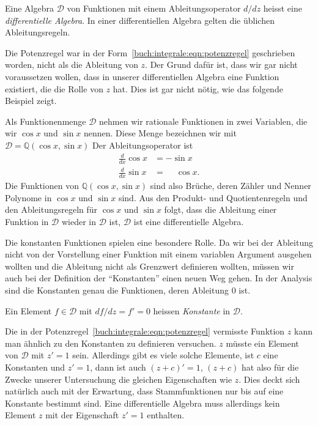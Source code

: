 \begin{definition}
Eine Algebra $\mathscr{D}$ von Funktionen mit einem Ableitungsoperator 
$d/dz$ heisst eine {\em differentielle Algebra}.
%
%
In einer differentiellen Algebra gelten die üblichen
Ableitungsregeln.
\end{definition}

Die Potenzregel war in der Form~\eqref{buch:integrale:eqn:potenzregel}
geschrieben worden, nicht als die Ableitung von $z$.
Der Grund dafür ist, dass wir gar nicht voraussetzen wollen, dass in
unserer differentiellen Algebra eine Funktion existiert, die die
Rolle von $z$ hat.
Dies ist gar nicht nötig, wie das folgende Beispiel zeigt.

\begin{beispiel}
Als Funktionenmenge $\mathscr{D}$ nehmen wir rationale Funktionen
in zwei Variablen, die wir $\cos x $ und $\sin x$ nennen.
Diese Menge bezeichnen wir mit
$\mathscr{D}=\mathbb{Q}(\cos x,\sin x)$
Der Ableitungsoperator ist 
\begin{align*}
\frac{d}{dx} \cos x &= -\sin x
\\
\frac{d}{dx} \sin x &= \phantom{-}\cos x.
\end{align*}
Die Funktionen von $\mathbb{Q}(\cos x,\sin x)$ sind also Brüche,
deren Zähler und Nenner Polynome in $\cos x$ und $\sin x$ sind.
Aus den Produkt- und Quotientenregeln und den Ableitungsregeln für
$\cos x$ und $\sin x$ folgt, dass die Ableitung einer Funktion in
$\mathscr{D}$ wieder in $\mathscr{D}$ ist, $\mathscr{D}$ ist eine
differentielle Algebra.
\end{beispiel}

Die konstanten Funktionen spielen eine besondere Rolle.
Da wir bei der Ableitung nicht von der Vorstellung einer
Funktion mit einem variablen Argument ausgehen wollten und 
die Ableitung nicht als Grenzwert definieren wollten, müssen
wir auch bei der Definition der ``Konstanten'' einen neuen
Weg gehen.
In der Analysis sind die Konstanten genau die Funktionen,
deren Ableitung $0$ ist.

\begin{definition}
\label{buch:integrale:def:konstante}
Ein Element $f\in \mathscr{D}$ mit $df/dz=f'=0$ heissen
{\em Konstante} in $\mathscr{D}$.
%
\end{definition}

Die in der Potenzregel~\eqref{buch:integrale:eqn:potenzregel}
vermisste Funktion $z$ kann man ähnlich zu den Konstanten
zu definieren versuchen.
$z$ müsste ein Element von $\mathscr{D}$ mit $z' = 1$ sein.
Allerdings gibt es viele solche Elemente, ist $c$ eine Konstanten
und $z'=1$, dann ist auch $(z+c)'=1$, $(z+c)$ hat also für
die Zwecke unserer Untersuchung die gleichen Eigenschaften wie
$z$.
Dies deckt sich natürlich auch mit der Erwartung, dass Stammfunktionen
nur bis auf eine Konstante bestimmt sind.
Eine differentielle Algebra muss allerdings kein Element $z$ mit der
Eigenschaft $z'=1$ enthalten.

